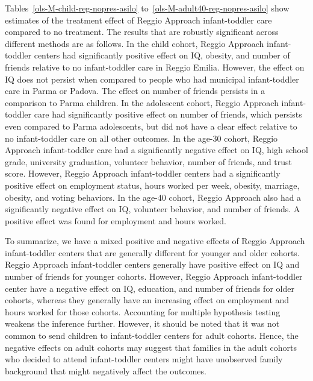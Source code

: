 Tables~\ref{ols-M-child-reg-nopres-asilo} to~\ref{ols-M-adult40-reg-nopres-asilo} show estimates of the treatment effect of Reggio Approach infant-toddler care compared to no treatment. The results that are robustly significant across different methods are as follows. In the child cohort, Reggio Approach infant-toddler centers had significantly positive effect on IQ, obesity, and number of friends relative to no infant-toddler care in Reggio Emilia. However, the effect on IQ does not persist when compared to people who had municipal infant-toddler care in Parma or Padova. The effect on number of friends persists in a comparison to Parma children. In the adolescent cohort, Reggio Approach infant-toddler care had significantly positive effect on number of friends, which persists even compared to Parma adolescents, but did not have a clear effect relative to no infant-toddler care on all other outcomes. In the age-30 cohort, Reggio Approach infant-toddler care had a significantly negative effect on IQ, high school grade, university graduation, volunteer behavior, number of friends, and trust score. However, Reggio Approach infant-toddler centers had a significantly positive effect on employment status, hours worked per week, obesity,  marriage, obesity, and voting behaviors. In the age-40 cohort, Reggio Approach also had a significantly negative effect on IQ, volunteer behavior, and number of friends. A positive effect was found for employment and hours worked.

To summarize, we have a mixed positive and negative effects of Reggio Approach infant-toddler centers that are generally different for younger and older cohorts. Reggio Approach infant-toddler centers generally have positive effect on IQ and number of friends for younger cohorts. However, Reggio Approach infant-toddler center have a negative effect on IQ, education, and number of friends for older cohorts, whereas they generally have an increasing effect on employment and hours worked for those cohorts. Accounting for multiple hypothesis testing weakens the inference further. However, it should be noted that it was not common to send children to infant-toddler centers for adult cohorts. Hence, the negative effects on adult cohorts may suggest that families in the adult cohorts who decided to attend infant-toddler centers might have unobserved family background that might negatively affect the outcomes.


